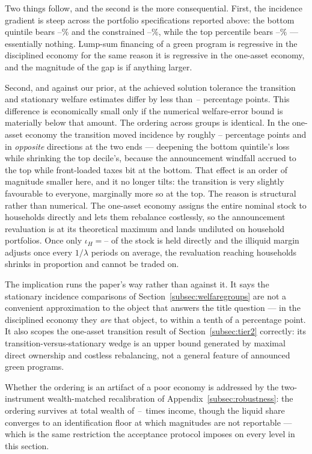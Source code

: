 \documentclass[12pt]{article}
\providecommand{\pendingnum}{\textit{--}}
\providecommand{\KVTrIota}{\pendingnum}\providecommand{\KVTrMargin}{\pendingnum}
\providecommand{\KVWelBot}{\pendingnum}\providecommand{\KVWelBotSS}{\pendingnum}
\providecommand{\KVWelTopOne}{\pendingnum}\providecommand{\KVWelTopOneSS}{\pendingnum}
\providecommand{\KVWelCon}{\pendingnum}\providecommand{\KVWelConSS}{\pendingnum}
\providecommand{\KVWelOneAssetGap}{\pendingnum}
\providecommand{\MThrW}{\pendingnum}\providecommand{\MThrLS}{\pendingnum}
\begin{document}
Two things follow, and the second is the more consequential. First, the
incidence gradient is steep across the portfolio specifications reported above: the bottom quintile
bears $\KVWelBot\%$ and the constrained $\KVWelCon\%$, while the top
percentile bears $\KVWelTopOne\%$ --- essentially nothing. Lump-sum
financing of a green program is regressive in the disciplined economy for
the same reason it is regressive in the one-asset economy, and the
magnitude of the gap is if anything larger.

Second, and against our prior, at the achieved solution tolerance the
transition and stationary welfare estimates differ by less than
$\KVWelMaxGap$ percentage points. This difference is economically small only
if the numerical welfare-error bound is materially below that amount. The
ordering across groups is identical. In the
one-asset economy the transition moved incidence by roughly
$\KVWelOneAssetGap$ percentage points and in \emph{opposite} directions at
the two ends --- deepening the bottom quintile's loss while shrinking the
top decile's, because the announcement windfall accrued to the top while
front-loaded taxes bit at the bottom. That effect is an order of magnitude
smaller here, and it no longer tilts: the transition is very slightly
favourable to everyone, marginally more so at the top. The reason is
structural rather than numerical. The one-asset economy assigns the entire
nominal stock to households directly and lets them rebalance costlessly, so
the announcement revaluation is at its theoretical maximum and lands
undiluted on household portfolios. Once only $\iota_H=\KVTrIota$ of the
stock is held directly and the illiquid margin adjusts once every
$1/\lambda$ periods on average, the revaluation reaching households shrinks
in proportion and cannot be traded on.

The implication runs the paper's way rather than against it. It says the
stationary incidence comparisons of Section~\ref{subsec:welfaregroups} are
not a convenient approximation to the object that answers the title
question --- in the disciplined economy they \emph{are} that object, to
within a tenth of a percentage point. It also scopes the one-asset
transition result of Section~\ref{subsec:tier2} correctly: its
transition-versus-stationary wedge is an upper bound generated by maximal
direct ownership and costless rebalancing, not a general feature of
announced green programs.

Whether the ordering is an artifact of a poor economy is addressed by the two-instrument wealth-matched recalibration of Appendix~\ref{subsec:robustness}: the ordering survives at total wealth of \MThrW\ times income, though the liquid share converges to an identification floor at which magnitudes are not reportable --- which is the same restriction the acceptance protocol imposes on every level in this section.
\end{document}
